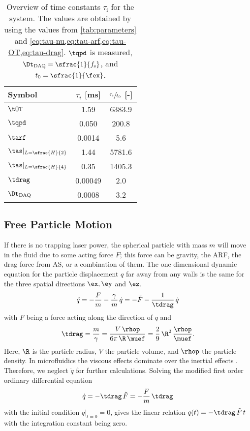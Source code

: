 \begin{table}
  \centering
  \begin{tabular}{l S[table-format=7.5]S[table-format=7.1]}
    \toprule
    \toprule
    {\bfseries Symbol} & {\bfseries $\tau_{i}$ [\si{\ms}]} & {\bfseries 
    $\sfrac{\tau_{i}}{t_{0}}$ [-]}  \\
    \midrule
    $\tOT$ & 1.59 & 6383.9 \\
    $\tqpd$ & 0.050 & 200.8 \\
    $\tarf$ & 0.0014 & 5.6 \\
    $\tas\vert_{L=\sfrac{H}{2}}$ & 1.44 & 5781.6\\
    $\tas\vert_{L=\sfrac{H}{4}}$ & 0.35 & 1405.3\\
    $\tdrag$ & 0.00049 & 2.0 \\
    \midrule
    $\Dt_{\text{DAQ}}$ & 0.0008 & 3.2 \\
    \bottomrule
    \bottomrule
    
  \end{tabular}
  \caption{Overview of time constants $\tau_{\text{i}}$ for the system. The 
    values are obtained by using the values from \cref{tab:parameters} and 
    \cref{eq:tau-nu,eq:tau-arf,eq:tau-OT,eq:tau-drag}. $\tqpd$ is measured, 
    $\Dt_{\text{DAQ}} = \sfrac{1}{f_{\text{s}}}$, and 
$t_{0}=\sfrac{1}{\fex}$.}\label{tab:time-constants}
\end{table}

\subsection{Free Particle Motion}

If there is no trapping laser power, the spherical particle with mass $m$ will 
move in the fluid due to some acting force $F$; this force can be gravity, the 
ARF, the drag force from AS, or a combination of them. The one dimensional 
dynamic equation for the particle displacement $q$ far away from any walls is 
the same for the three spatial directions $\ex, \ey$ and $\ez$.
\begin{equation}
  \ddot{q} = - \frac{F}{m} - \frac{\gamma}{m}\,\dot{q} =
  - \tilde{F} - \frac{1}{\tdrag}\,\dot{q}
  \label{eq:free-fall}
\end{equation}
with $F$ being a force acting along the direction of $q$ and
\begin{equation}
  \tdrag = \frac{m}{\gamma} = \frac{V\,\rhop}{6\pi\,\R\,\muef}
  = \frac{2}{9}\,\R^{2}\,\frac{\rhop}{\muef}.
  \label{eq:tau-drag}
\end{equation}
Here, $\R$ is the particle radius, $V$ the particle volume, and $\rhop$ the 
particle density. In microfluidics the viscous effects dominate over the 
inertial effects \cite{Bruus2015}. Therefore, we neglect $\ddot{q}$ for further 
calculations. Solving the modified first order ordinary differential equation
\begin{equation}
    \dot{q}= - \tdrag\,\tilde{F} = -\frac{F}{m}\,\tdrag
  \label{eq:mod-free-fall}
\end{equation}
with the initial condition $q\vert_{t=0} = 0$, gives the linear relation $q(t) 
= - \tdrag\,\tilde{F}\,t$ with the integration constant being zero.

